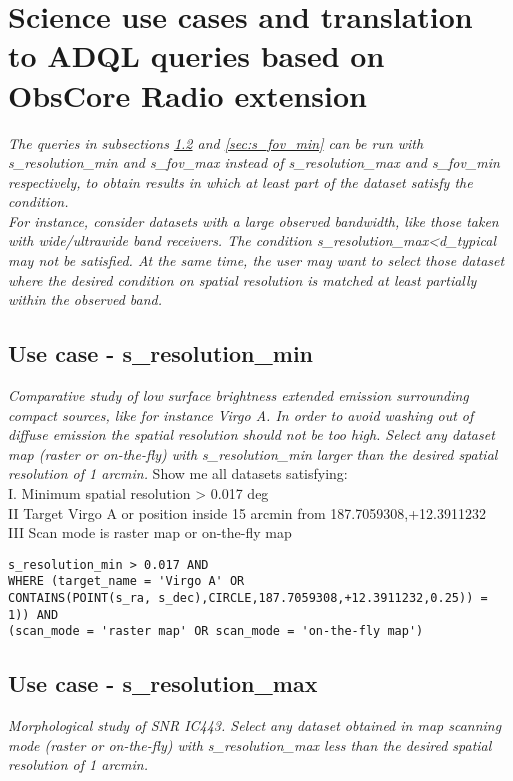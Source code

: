 \section{Science use cases and translation to ADQL queries  based on ObsCore Radio extension  }
\label{ADQLusecases}

\textit{ The  queries in subsections \ref{sec:s_resolution_max} and \ref{sec:s_fov_min}
can be run with s\_resolution\_min and s\_fov\_max instead of s\_resolution\_max and 
 s\_fov\_min respectively, to obtain results in which at least part of the dataset satisfy the condition.\\
For instance, consider datasets with a large observed bandwidth, like those taken with wide/ultrawide band receivers.
The condition s\_resolution\_max<d\_typical may not be satisfied. At the same time, the user may want to select those 
dataset where the desired condition on spatial resolution is matched at least partially  within the observed band.}

\subsection{Use case - s\_resolution\_min}
\label{sec:s_resolution_min}
\textit{Comparative study of low surface brightness extended emission surrounding compact sources, like for instance Virgo A.
In order to avoid washing out of diffuse emission the spatial resolution should not be too high.
Select any dataset map (raster or on-the-fly) with s\_resolution\_min larger than the desired spatial resolution of 1 arcmin.}
Show me all datasets satisfying: \\
I. Minimum spatial resolution > 0.017 deg \\
II Target Virgo A or position inside 15 arcmin from 187.7059308,+12.3911232 \\
III Scan mode is raster map or on-the-fly map

\begin{verbatim}
s_resolution_min > 0.017 AND
WHERE (target_name = 'Virgo A' OR
CONTAINS(POINT(s_ra, s_dec),CIRCLE,187.7059308,+12.3911232,0.25)) = 1)) AND
(scan_mode = 'raster map' OR scan_mode = 'on-the-fly map')
\end{verbatim}

\subsection{Use case - s\_resolution\_max}
\label{sec:s_resolution_max}
\textit{Morphological study of SNR IC443. Select any dataset obtained in map scanning mode (raster or on-the-fly) with s\_resolution\_max less than the desired spatial resolution of 1 arcmin.}

